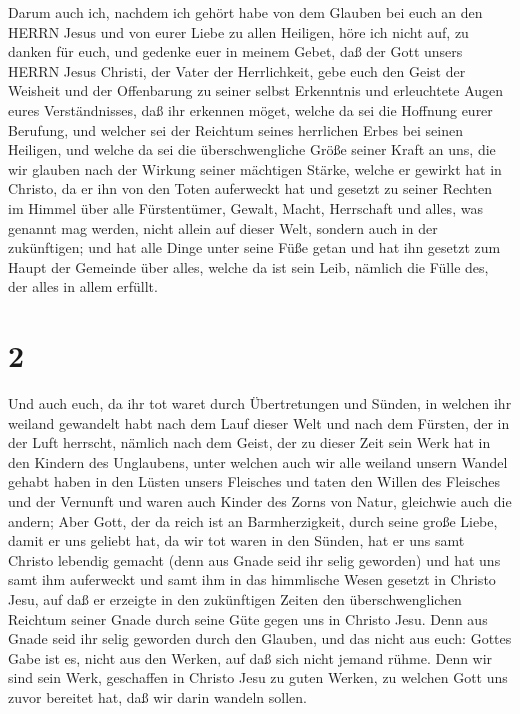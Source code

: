  Darum auch ich, nachdem ich gehört habe von dem Glauben
bei euch an den HERRN Jesus und von eurer Liebe zu allen Heiligen,
 höre ich nicht auf, zu danken für euch, und gedenke euer
in meinem Gebet,  daß der Gott unsers HERRN Jesus Christi,
der Vater der Herrlichkeit, gebe euch den Geist der Weisheit und der
Offenbarung zu seiner selbst Erkenntnis  und erleuchtete
Augen eures Verständnisses, daß ihr erkennen möget, welche da sei die
Hoffnung eurer Berufung, und welcher sei der Reichtum seines herrlichen
Erbes bei seinen Heiligen,  und welche da sei die
überschwengliche Größe seiner Kraft an uns, die wir glauben nach der
Wirkung seiner mächtigen Stärke,  welche er gewirkt hat in
Christo, da er ihn von den Toten auferweckt hat und gesetzt zu seiner
Rechten im Himmel  über alle Fürstentümer, Gewalt, Macht,
Herrschaft und alles, was genannt mag werden, nicht allein auf dieser
Welt, sondern auch in der zukünftigen;  und hat alle Dinge
unter seine Füße getan und hat ihn gesetzt zum Haupt der Gemeinde über
alles,  welche da ist sein Leib, nämlich die Fülle des, der
alles in allem erfüllt.

\hypertarget{section-1}{%
\section{2}\label{section-1}}

 Und auch euch, da ihr tot waret durch Übertretungen und
Sünden,  in welchen ihr weiland gewandelt habt nach dem Lauf
dieser Welt und nach dem Fürsten, der in der Luft herrscht, nämlich nach
dem Geist, der zu dieser Zeit sein Werk hat in den Kindern des
Unglaubens,  unter welchen auch wir alle weiland unsern
Wandel gehabt haben in den Lüsten unsers Fleisches und taten den Willen
des Fleisches und der Vernunft und waren auch Kinder des Zorns von
Natur, gleichwie auch die andern;  Aber Gott, der da reich
ist an Barmherzigkeit, durch seine große Liebe, damit er uns geliebt
hat,  da wir tot waren in den Sünden, hat er uns samt
Christo lebendig gemacht (denn aus Gnade seid ihr selig geworden)
 und hat uns samt ihm auferweckt und samt ihm in das
himmlische Wesen gesetzt in Christo Jesu,  auf daß er
erzeigte in den zukünftigen Zeiten den überschwenglichen Reichtum seiner
Gnade durch seine Güte gegen uns in Christo Jesu.  Denn aus
Gnade seid ihr selig geworden durch den Glauben, und das nicht aus euch:
Gottes Gabe ist es,  nicht aus den Werken, auf daß sich
nicht jemand rühme.  Denn wir sind sein Werk, geschaffen in
Christo Jesu zu guten Werken, zu welchen Gott uns zuvor bereitet hat,
daß wir darin wandeln sollen.

